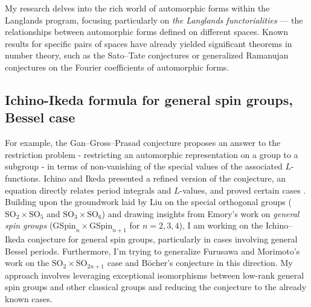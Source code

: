 \documentclass[12pt]{article}
\begin{document}
My research delves into the rich world of automorphic forms within the Langlands program, focusing particularly on \emph{the Langlands functorialities} — the relationships between automorphic forms defined on different spaces.
Known results for specific pairs of spaces have already yielded significant theorems in number theory, such as the Sato--Tate conjectures \cite{harris2010family,barnet2011family} or generalized Ramanujan conjectures \cite{sarnak2005notes} on the Fourier coefficients of automorphic forms.


\subsection*{Ichino-Ikeda formula for general spin groups, Bessel case}


For example, the Gan--Gross--Prasad conjecture \cite{gan2011symplectic} proposes an answer to the restriction problem - restricting an automorphic representation on a group to a subgroup - in terms of non-vanishing of the special values of the  associated $L$-functions. 
Ichino and Ikeda presented a refined version of the conjecture, an equation directly relates period integrals and $L$-values, and proved certain cases \cite{ichino2010periods}. 
Building upon the groundwork laid by Liu \cite{liu2016refined} on the special orthogonal groups ($\mathrm{SO}_{2} \times \mathrm{SO}_{5}$ and $\mathrm{SO}_{3} \times \mathrm{SO}_{6}$) and drawing insights from Emory's work \cite{emory2020global} on \emph{general spin groups} ($\mathrm{GSpin}_{n} \times \mathrm{GSpin}_{n+1}$ for $n = 2, 3, 4$), I am working on the Ichino--Ikeda conjecture for general spin groups, particularly in cases involving general Bessel periods.
Furthermore, I'm trying to generalize Furusawa and Morimoto's work on the $\mathrm{SO}_{2} \times \mathrm{SO}_{2n+1}$ case and B\"ocher's conjecture \cite{furusawa2020refined} in this direction.
My approach involves leveraging exceptional isomorphisms between low-rank general spin groups and other classical groups and reducing the conjecture to the already known cases.
\end{document}
